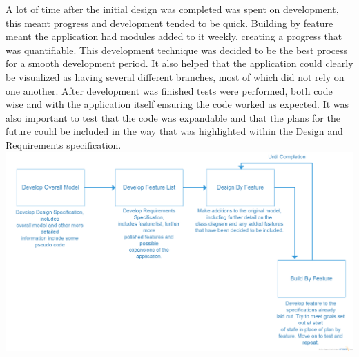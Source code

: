 A lot of time after the initial design was completed was spent on development, this meant progress and development tended to be quick. Building by feature meant the application had modules added to it weekly, creating a progress that was quantifiable. This development technique was decided to be the best process for a smooth development period. It also helped that the application could clearly be visualized as having several different branches, most of which did not rely on one another. After development was finished tests were performed, both code wise and with the application itself ensuring the code worked as expected. It was also important to test that the code was expandable and that the plans for the future could be included in the way that was highlighted within the Design and Requirements specification. \\
\includegraphics[scale=0.2]{Chapter1/process.png}\\
